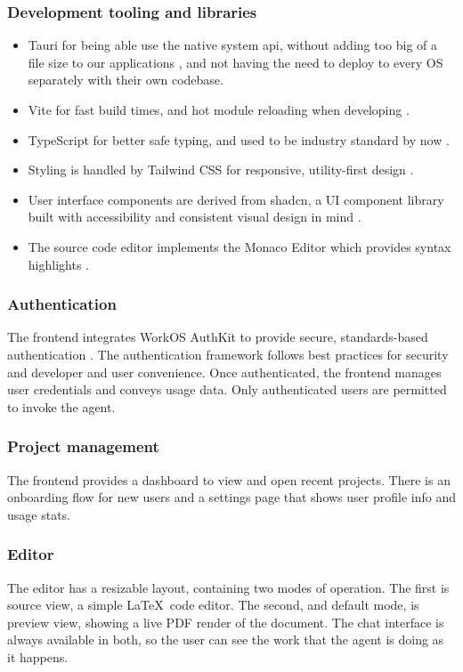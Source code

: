 \subsubsection{Development tooling and libraries}
\begin{itemize}
\item Tauri for being able use the native system api, without adding too big of a file size to our applications \cite{tauri}, and not having the need to deploy to every OS separately with their own codebase.
\item Vite for fast build times, and hot module reloading when developing \cite{vite}.
\item TypeScript for better safe typing, and used to be industry standard by now \cite{typescript}.
\item Styling is handled by Tailwind CSS for responsive, utility-first design \cite{tailwind}.
\item User interface components are derived from shadcn, a UI component library built with accessibility and consistent visual design in mind \cite{shadcn}.
\item The source code editor implements the Monaco Editor which provides syntax highlights \cite{monaco}.
\end{itemize}

\subsubsection{Authentication}
The frontend integrates WorkOS AuthKit to provide secure, standards-based authentication \cite{workos}.
The authentication framework follows best practices for security and developer and user convenience.
Once authenticated, the frontend manages user credentials and conveys usage data.
Only authenticated users are permitted to invoke the agent.

\subsubsection{Project management}
The frontend provides a dashboard to view and open recent projects.
There is an onboarding flow for new users and a settings page that shows user profile info and usage stats.

\subsubsection{Editor}
The editor has a resizable layout, containing two modes of operation.
The first is source view, a simple \LaTeX\ code editor.
The second, and default mode, is preview view, showing a live PDF render of the document.
The chat interface is always available in both, so the user can see the work that the agent is doing as it happens.

